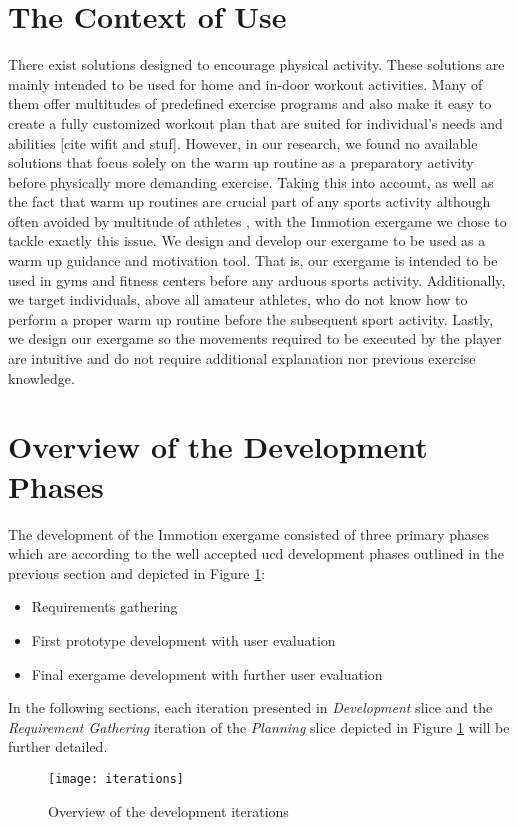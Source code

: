 \section{The Context of Use}
There exist solutions designed to encourage physical activity. These solutions are mainly intended to be used for home and in-door workout activities. Many of them offer multitudes of predefined exercise programs and also make it easy to create a fully customized workout plan that are suited for individual's needs and abilities [cite wifit and stuf]. However, in our research, we found no available solutions that focus solely on the warm up routine as a preparatory activity before physically more demanding exercise. Taking this into account, as well as the fact that warm up routines are crucial part of any sports activity \cite{bishop2003warm1,shellock1985warming} although often avoided by multitude of athletes \cite{fradkin2006does}, with the Immotion exergame we chose to tackle exactly this issue. We design and develop our exergame to be used as a warm up guidance and motivation tool. That is, our exergame is intended to be used in gyms and fitness centers before any arduous sports activity. Additionally, we target individuals, above all amateur athletes, who do not know how to perform a proper warm up routine before the subsequent sport activity. Lastly, we design our exergame so the movements required to be executed by the player are intuitive and do not require additional explanation nor previous exercise knowledge. \pagebreak
\section{Overview of the Development Phases}
The development of the Immotion exergame consisted of three primary phases which are according to the well accepted \acrshort{ucd} development phases outlined in the previous section and depicted in Figure \ref{fig:iterations}: 
\begin{itemize}
\item Requirements gathering 
\item First prototype development with user evaluation
\item Final exergame development with further user evaluation
\end{itemize}
In the following sections, each iteration presented in \textit{Development} slice and the \textit{Requirement Gathering} iteration of the \textit{Planning} slice depicted in Figure \ref{fig:iterations} will be further detailed. 
\begin{figure}[h]
    \centering
    \texttt{[image: iterations]}
    \caption{Overview of the development iterations}
    \label{fig:iterations}
\end{figure}
